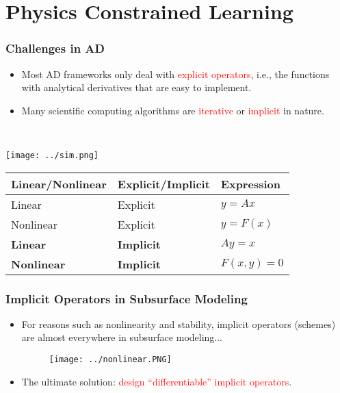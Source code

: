 \documentclass[usenames,dvipsnames]{beamer}
\begin{document}
\section{Physics Constrained Learning}
\begin{frame}


	\frametitle{Challenges in AD}
	
	
	\begin{minipage}[t]{0.49\textwidth}
	\vspace{-3cm}
\begin{itemize}
	\item Most AD frameworks only deal with \textcolor{red}{explicit operators}, i.e., the functions with analytical derivatives that are easy to implement.  
	\item Many scientific computing algorithms are \textcolor{red}{iterative} or \textcolor{red}{implicit} in nature.
\end{itemize}
\end{minipage}~
\begin{minipage}[t]{0.49\textwidth}
  \texttt{[image: ../sim.png]}
\end{minipage}

\begin{table}[]
\begin{tabular}{@{}lll@{}}
\toprule
Linear/Nonlinear & Explicit/Implicit & Expression   \\ \midrule
Linear           & Explicit          & $y=Ax$       \\
Nonlinear        & Explicit          & $y = F(x)$   \\
\textbf{Linear}           & \textbf{Implicit}          & $Ay = x$     \\
\textbf{Nonlinear}        & \textbf{Implicit}          & $F(x,y) = 0$ \\ \bottomrule
\end{tabular}
\end{table}
\end{frame}



\begin{frame}
	\frametitle{Implicit Operators in Subsurface Modeling}
		
		\begin{itemize}
			\item For reasons such as nonlinearity and stability, implicit operators (schemes) are almost everywhere in subsurface modeling...
				\begin{figure}
				\centering
				\texttt{[image: ../nonlinear.PNG]}
			\end{figure}
			\item The ultimate solution: \textcolor{red}{design ``differentiable'' implicit operators}.
		\end{itemize}
		
\end{frame}
\end{document}
